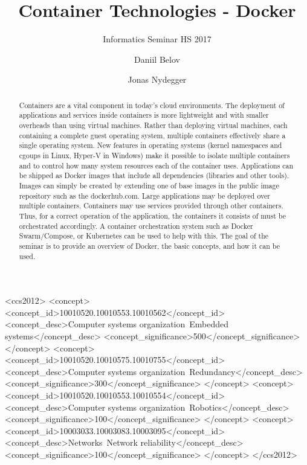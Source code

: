 \documentclass[sigconf]{acmart}
\begin{document}
\title{Container Technologies - Docker}
\subtitle{Informatics Seminar HS 2017}

\author{Daniil Belov}

\author{Jonas Nydegger}

\begin{abstract}
	Containers are a vital component in today's cloud environments. 
	The deployment of applications and services inside containers is more lightweight and with smaller overheads than using virtual machines.
	Rather than deploying virtual machines, each containing a complete guest operating system, multiple containers effectively share a single operating system. 
	New features in operating systems (kernel namespaces and cgoups in Linux, Hyper-V in Windows)
	make it possible to isolate multiple containers and to control how many system resources each of the container uses.
	Applications can be shipped as Docker images that include all dependencies (libraries and other tools). 
	Images can simply be created by extending one of base images in the public image repository such as the dockerhub.com.
	Large applications may be deployed over multiple containers. Containers may use services provided through other containers. 
	Thus, for a correct operation of the application, the containers it consists of must be orchestrated accordingly. 
	A container orchestration system such as Docker Swarm/Compose, or Kubernetes can be used to help with this.
	The goal of the seminar is to provide an overview of Docker, the basic concepts, and how it can be used.
\end{abstract}

%
%
\begin{CCSXML}
<ccs2012>
 <concept>
  <concept_id>10010520.10010553.10010562</concept_id>
  <concept_desc>Computer systems organization~Embedded systems</concept_desc>
  <concept_significance>500</concept_significance>
 </concept>
 <concept>
  <concept_id>10010520.10010575.10010755</concept_id>
  <concept_desc>Computer systems organization~Redundancy</concept_desc>
  <concept_significance>300</concept_significance>
 </concept>
 <concept>
  <concept_id>10010520.10010553.10010554</concept_id>
  <concept_desc>Computer systems organization~Robotics</concept_desc>
  <concept_significance>100</concept_significance>
 </concept>
 <concept>
  <concept_id>10003033.10003083.10003095</concept_id>
  <concept_desc>Networks~Network reliability</concept_desc>
  <concept_significance>100</concept_significance>
 </concept>
</ccs2012>  
\end{CCSXML}
\end{document}
